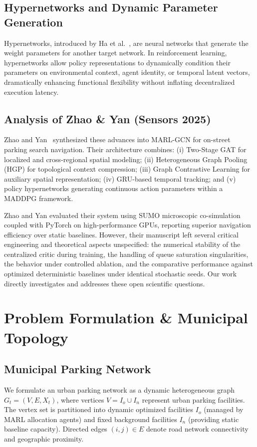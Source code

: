 \documentclass[journal]{IEEEtran}
\begin{document}
\subsection{Hypernetworks and Dynamic Parameter Generation}
Hypernetworks, introduced by Ha et al.~\cite{ha2017hypernetworks}, are neural networks that generate the weight parameters for another target network. In reinforcement learning, hypernetworks allow policy representations to dynamically condition their parameters on environmental context, agent identity, or temporal latent vectors, dramatically enhancing functional flexibility without inflating decentralized execution latency.

\subsection{Analysis of Zhao \& Yan (Sensors 2025)}
Zhao and Yan~\cite{zhao2025deep} synthesized these advances into MARL-GCN for on-street parking search navigation. Their architecture combines: (i) Two-Stage GAT for localized and cross-regional spatial modeling; (ii) Heterogeneous Graph Pooling (HGP) for topological context compression; (iii) Graph Contrastive Learning for auxiliary spatial representation; (iv) GRU-based temporal tracking; and (v) policy hypernetworks generating continuous action parameters within a MADDPG framework. 

Zhao and Yan evaluated their system using SUMO microscopic co-simulation coupled with PyTorch on high-performance GPUs, reporting superior navigation efficiency over static baselines. However, their manuscript left several critical engineering and theoretical aspects unspecified: the numerical stability of the centralized critic during training, the handling of queue saturation singularities, the behavior under controlled ablation, and the comparative performance against optimized deterministic baselines under identical stochastic seeds. Our work directly investigates and addresses these open scientific questions.

\section{Problem Formulation \& Municipal Topology}
\label{sec:formulation}

\subsection{Municipal Parking Network}
We formulate an urban parking network as a dynamic heterogeneous graph $G_t = (V, E, X_t)$, where vertices $V = I_o \cup I_n$ represent urban parking facilities. The vertex set is partitioned into dynamic optimized facilities $I_o$ (managed by MARL allocation agents) and fixed background facilities $I_n$ (providing static baseline capacity). Directed edges $(i, j) \in E$ denote road network connectivity and geographic proximity. 
\end{document}
